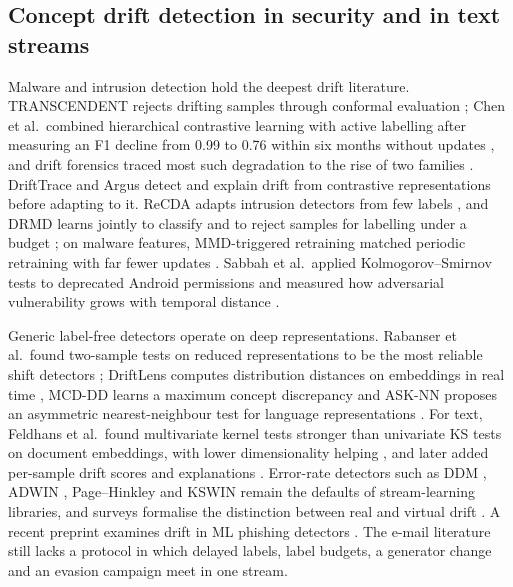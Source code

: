 \subsection{Concept drift detection in security and in text streams}
Malware and intrusion detection hold the deepest drift literature. TRANSCENDENT rejects drifting samples through conformal evaluation \cite{barbero2022}; Chen et al.\ combined hierarchical contrastive learning with active labelling after measuring an F1 decline from 0.99 to 0.76 within six months without updates \cite{chen2023usenix}, and drift forensics traced most such degradation to the rise of two families \cite{chow2023}. DriftTrace \cite{pan2026} and Argus \cite{han2026} detect and explain drift from contrastive representations before adapting to it. ReCDA adapts intrusion detectors from few labels \cite{yang2025}, and DRMD learns jointly to classify and to reject samples for labelling under a budget \cite{mcfadden2026}; on malware features, MMD-triggered retraining matched periodic retraining with far fewer updates \cite{berruz2026}. Sabbah et al.\ applied Kolmogorov--Smirnov tests to deprecated Android permissions \cite{sabbah2026} and measured how adversarial vulnerability grows with temporal distance \cite{sabbah2027}.

Generic label-free detectors operate on deep representations. Rabanser et al.\ found two-sample tests on reduced representations to be the most reliable shift detectors \cite{rabanser2019}; DriftLens computes distribution distances on embeddings in real time \cite{greco2025}, MCD-DD learns a maximum concept discrepancy \cite{wan2024} and ASK-NN proposes an asymmetric nearest-neighbour test for language representations \cite{zakharov2026}. For text, Feldhans et al.\ found multivariate kernel tests stronger than univariate KS tests on document embeddings, with lower dimensionality helping \cite{feldhans2021}, and later added per-sample drift scores and explanations \cite{feldhans2024}. Error-rate detectors such as DDM \cite{gama2004}, ADWIN \cite{bifet2007}, Page--Hinkley and KSWIN \cite{raab2020} remain the defaults of stream-learning libraries, and surveys formalise the distinction between real and virtual drift \cite{lu2019,hinder2024}. A recent preprint examines drift in ML phishing detectors \cite{fernando2026}. The e-mail literature still lacks a protocol in which delayed labels, label budgets, a generator change and an evasion campaign meet in one stream.

